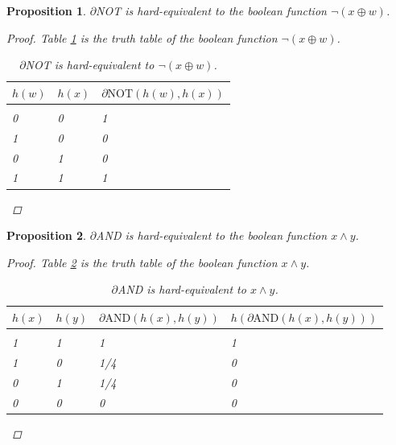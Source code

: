 \documentclass{article} %
\newtheorem{prop}{Proposition}
\begin{document}
\begin{prop}\label{prop:not}
	$\partial${NOT} is hard-equivalent to the boolean function
	$\neg (x \oplus w)$.
\begin{proof}
	Table \ref{not-table} is the truth table of the boolean function $\neg (x \oplus w)$.
	\begin{table}
		\begin{center}
			\begin{tabular}{lll}
				\multicolumn{1}{c}{$h(w)$}  &\multicolumn{1}{c}{$h(x)$} &\multicolumn{1}{c}{$\partial\text{NOT}(h(w), h(x))$}
				\\ \hline \\
				0 & 0 & 1\\
				1 & 0 & 0\\
				0 & 1 & 0\\
				1 & 1 & 1\\
			\end{tabular}
		\end{center}
		\caption{$\partial${NOT} is hard-equivalent to $\neg (x \oplus w)$.}\label{not-table}
		
	\end{table}
\end{proof}
\end{prop}


\begin{prop}\label{prop:and}
	$\partial${AND} is hard-equivalent to the boolean function $x \wedge y$.
\begin{proof}
	Table \ref{and-table} is the truth table of the boolean function $x \wedge y$.
	\begin{table}
		\begin{center}
			\begin{tabular}{llll}
				\multicolumn{1}{c}{$h(x)$}  &\multicolumn{1}{c}{$h(y)$} &\multicolumn{1}{c}{$\partial\text{AND}(h(x), h(y))$} &\multicolumn{1}{c}{$h(\partial\text{AND}(h(x), h(y)))$}
				\\ \hline \\
				1 & 1 & 1 & 1\\
				1 & 0 & 1/4 & 0\\
				0 & 1 & 1/4 & 0\\
				0 & 0 & 0 & 0\\
			\end{tabular}
		\end{center}
		\caption{$\partial${AND} is hard-equivalent to $x \wedge y$.}\label{and-table}
		
	\end{table}
\end{proof}
\end{prop}
\end{document}
